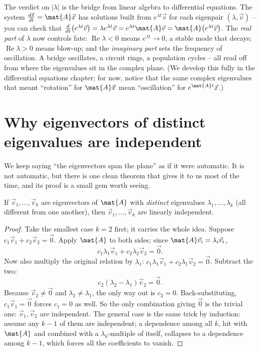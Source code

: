 \begin{connectionbox}
The verdict on $|\lambda|$ is the bridge from linear algebra to differential
equations. The system $\frac{d\vec{x}}{dt}=\mat{A}\vec{x}$ has solutions built
from $e^{\lambda t}\vec{v}$ for each eigenpair $(\lambda,\vec{v})$ -- you can check
that $\frac{d}{dt}\bigl(e^{\lambda t}\vec{v}\bigr)=\lambda e^{\lambda t}\vec{v}
=e^{\lambda t}\mat{A}\vec{v}=\mat{A}\bigl(e^{\lambda t}\vec{v}\bigr)$. The
\emph{real part} of $\lambda$ now controls fate: $\operatorname{Re}\lambda<0$ means
$e^{\lambda t}\to 0$, a stable mode that decays; $\operatorname{Re}\lambda>0$ means
blow-up; and the \emph{imaginary part} sets the frequency of oscillation. A bridge
oscillates, a circuit rings, a population cycles -- all read off from where the
eigenvalues sit in the complex plane. (We develop this fully in the differential
equations chapter; for now, notice that the same complex eigenvalues that meant
``rotation'' for $\mat{A}\vec{x}$ mean ``oscillation'' for $e^{\mat{A}t}\vec{x}$.)
\end{connectionbox}

\section{Why eigenvectors of distinct eigenvalues are independent}
\label{ch23:independence}

We keep saying ``the eigenvectors span the plane'' as if it were automatic. It is
not automatic, but there is one clean theorem that gives it to us most of the time,
and its proof is a small gem worth seeing.

\begin{theorem}
\label{ch23:thm-indep}
If $\vec{v}_1,\dots,\vec{v}_k$ are eigenvectors of $\mat{A}$ with \emph{distinct}
eigenvalues $\lambda_1,\dots,\lambda_k$ (all different from one another), then
$\vec{v}_1,\dots,\vec{v}_k$ are linearly independent.
\end{theorem}

\begin{proof}
Take the smallest case $k=2$ first; it carries the whole idea. Suppose
$c_1\vec{v}_1+c_2\vec{v}_2=\vec{0}$. Apply $\mat{A}$ to both sides; since
$\mat{A}\vec{v}_i=\lambda_i\vec{v}_i$,
\[
  c_1\lambda_1\vec{v}_1+c_2\lambda_2\vec{v}_2=\vec{0}.
\]
Now also multiply the original relation by $\lambda_1$:
$c_1\lambda_1\vec{v}_1+c_2\lambda_1\vec{v}_2=\vec{0}$. Subtract the two:
\[
  c_2(\lambda_2-\lambda_1)\vec{v}_2=\vec{0}.
\]
Because $\vec{v}_2\neq\vec{0}$ and $\lambda_2\neq\lambda_1$, the only way out is
$c_2=0$. Back-substituting, $c_1\vec{v}_1=\vec{0}$ forces $c_1=0$ as well. So the
only combination giving $\vec{0}$ is the trivial one: $\vec{v}_1,\vec{v}_2$ are
independent. The general case is the same trick by induction: assume any $k-1$ of
them are independent; a dependence among all $k$, hit with $\mat{A}$ and combined
with a $\lambda_k$-multiple of itself, collapses to a dependence among $k-1$, which
forces all the coefficients to vanish.
\end{proof}

